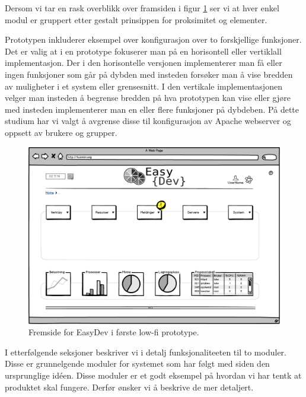 Dersom vi tar en rask overblikk over framsiden i figur \ref{fig:lowfi_fremside} ser vi at hver enkel modul er gruppert etter gestalt prinsippen for proksimitet og elementer.\cite{forelesning:tulpesh}

Prototypen inkluderer eksempel over konfigurasjon over to forskjellige funksjoner.
Det er valig at i en prototype fokuserer man på en horisontell eller vertiklall implementasjon. Der i den horisontelle versjonen implementerer man få eller ingen funksjoner som går på dybden med insteden forsøker man å vise bredden av muligheter i et system eller grensesnitt. I den vertikale implementasjonen velger man insteden å begrense bredden på hva prototypen kan vise eller gjøre med insteden implementerer man en eller flere funksjoner på dybdeben.\cite{book:utforming}
På dette studium har vi valgt å avgrense disse til konfigurasjon av Apache webserver og oppsett av brukere og grupper. 

\begin{figure}
\includegraphics[width=\textwidth,height=\textheight,keepaspectratio]{./img/prosessdokumentasjon/lowfi/fremside.png}
\caption[Low-fi prototype]{Fremside for EasyDev i første low-fi prototype.}
\label{fig:lowfi_fremside}
\end{figure}


I etterfølgende seksjoner beskriver vi i detalj funksjonaliteeten til to moduler. Disse er grunnelgende moduler for systemet som har følgt med siden den ursprunglige idéen. Disse moduler er et godt eksempel på hvordan vi har tentk at produktet skal fungere. Derfør ønsker vi å beskrive de mer detaljert.

